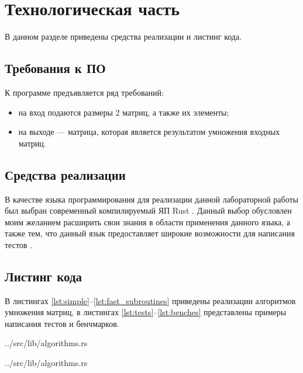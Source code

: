 \chapter{Технологическая часть}

В данном разделе приведены средства реализации и листинг кода.

\section{Требования к ПО}

К программе предъявляется ряд требований:
\begin{itemize}
	\item на вход подаются размеры 2 матриц, а также их элементы;
	\item на выходе — матрица, которая является результатом умножения входных матриц.
\end{itemize}

\section{Средства реализации}

В качестве языка программирования для реализации данной лабораторной работы был выбран современный компилируемый ЯП Rust \cite{rustlang}. Данный выбор обусловлен моим желанием расширить свои знания в области применения данного языка, а также тем, что данный язык предоставляет широкие возможности для написания тестов \cite{rusttest}.

\section{Листинг кода}

В листингах \ref{lst:simple}--\ref{lst:fast_subroutines} приведены реализации алгоритмов умножения матриц, в листингах \ref{lst:tests}--\ref{lst:benches} представлены примеры написания тестов и бенчмарков.

\begin{lstinputlisting}[
	caption={Стандартный алгоритм умножения матриц},
	label={lst:simple},
	style={rustlang},
	linerange={19-31}
]{../src/lib/algorithms.rs}
\end{lstinputlisting}

\begin{lstinputlisting}[
	caption={Алгоритм Копперсмита — Винограда},
	label={lst:vino},
	style={rustlang},
	linerange={89-113}
]{../src/lib/algorithms.rs}
\end{lstinputlisting}

